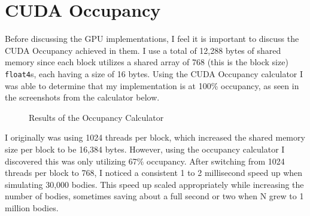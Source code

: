 \section{CUDA Occupancy}
Before discussing the GPU implementations, I feel it is important to discuss the CUDA Occupancy achieved in them. 
I use a total of 12,288 bytes of shared memory since each block utilizes a shared array of 
768 (this is the block size) \verb|float4|s, each having a size of 16 bytes. Using the CUDA Occupancy calculator \cite{Mao_2022}
I was able to determine that my implementation is at 100\% occupancy, as seen in the screenshots from the calculator below.
\begin{figure}[H]%
    \centering
    \qquad
    \caption{Results of the Occupancy Calculator}%
    \label{fig:graphs n stuff yep}%
    \cite{Mao_2022}
\end{figure}

\indent I originally was using 1024 threads per block, which increased the shared memory size per block to be 16,384 bytes. However, 
using the occupancy calculator I discovered this was only utilizing 67\% occupancy. After switching from 1024 threads per block
to 768, I noticed a consistent 1 to 2 millisecond speed up when simulating 30,000 bodies. This speed up scaled appropriately while increasing 
the number of bodies, sometimes saving about a full second or two when N grew to 1 million bodies.

